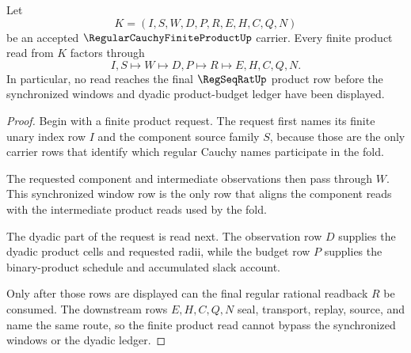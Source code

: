 \begin{theorem}\label{thm:regular-cauchy-finite-product-tail-budget}
Let
$$
K=(I,S,W,D,P,R,E,H,C,Q,N)
$$
be an accepted $\RegularCauchyFiniteProductUp$ carrier. Every finite product read from $K$ factors through
$$
I,S \longmapsto W \longmapsto D,P \longmapsto R \longmapsto E,H,C,Q,N .
$$
In particular, no read reaches the final $\RegSeqRatUp$ product row before the synchronized windows and dyadic product-budget ledger have been displayed.
\end{theorem}
\begin{proof}
Begin with a finite product request. The request first names its finite unary index row $I$ and the component source family $S$, because those are the only carrier rows that identify which regular Cauchy names participate in the fold.

The requested component and intermediate observations then pass through $W$. This synchronized window row is the only row that aligns the component reads with the intermediate product reads used by the fold.

The dyadic part of the request is read next. The observation row $D$ supplies the dyadic product cells and requested radii, while the budget row $P$ supplies the binary-product schedule and accumulated slack account.

Only after those rows are displayed can the final regular rational readback $R$ be consumed. The downstream rows $E,H,C,Q,N$ seal, transport, replay, source, and name the same route, so the finite product read cannot bypass the synchronized windows or the dyadic ledger.
\end{proof}


